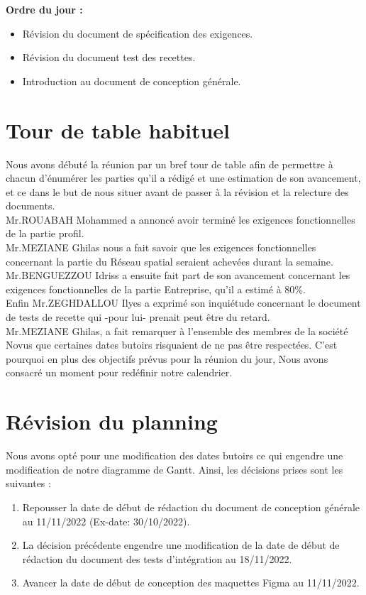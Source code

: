 \documentclass[a4paper, 12pt]{article}
\begin{document}
\textbf{Ordre du jour :}
 \begin{itemize}
     \item Révision du document de spécification des exigences.
     \item Révision du document test des recettes.
     \item Introduction au document de conception générale.
 \end{itemize}
\section{Tour de table habituel}
Nous avons débuté la réunion par un bref tour de table afin de permettre à chacun d'énumérer les parties qu'il a rédigé et une estimation de son avancement, et ce dans le but de nous situer avant de passer à la révision et la relecture des documents. \\

Mr.ROUABAH Mohammed a annoncé avoir terminé les exigences fonctionnelles de la partie profil. \\
Mr.MEZIANE Ghilas nous a fait savoir que les exigences fonctionnelles concernant la partie du Réseau spatial seraient achevées durant la semaine.\\
Mr.BENGUEZZOU Idriss a ensuite fait part de son avancement concernant les exigences fonctionnelles de la partie Entreprise, qu'il a estimé à 80\%. \\
Enfin Mr.ZEGHDALLOU Ilyes a exprimé son inquiétude concernant le document de tests de recette qui -pour lui- prenait peut être du retard.\\
Mr.MEZIANE Ghilas, a fait remarquer à l'ensemble des membres de la société Novus que certaines dates butoirs risquaient de ne pas être respectées. C'est pourquoi en plus des objectifs prévus pour la réunion du jour, Nous avons consacré un moment pour redéfinir notre calendrier.

\section{Révision du planning}
Nous avons opté pour une modification des dates butoirs ce qui engendre une modification de notre diagramme de Gantt.
Ainsi, les décisions prises sont les suivantes :

\begin{enumerate}
    \item Repousser la date de début de rédaction du document de conception générale au 11/11/2022 (Ex-date: 30/10/2022).\\
    \item La décision précédente engendre une modification de la date de début de rédaction du document des tests d'intégration au 18/11/2022. \\
    \item Avancer la date de début de conception des maquettes Figma au 11/11/2022.
\end{enumerate}
\end{document}
